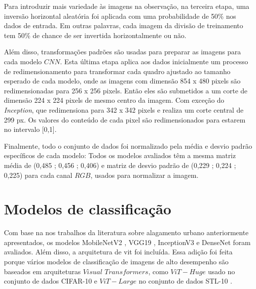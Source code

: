 
Para introduzir mais variedade às imagens na observação, na terceira etapa, uma inversão horizontal aleatória foi aplicada com uma probabilidade de 50\% nos dados de entrada.
Em outras palavras, cada imagem da divisão de treinamento tem 50\% de chance de ser invertida horizontalmente ou não.

Além disso, transformações padrões são usadas para preparar as imagens para cada modelo $CNN$. 
Esta última etapa aplica aos dados inicialmente um processo de redimensionamento para transformar cada quadro ajustado ao tamanho esperado de cada modelo,
onde as imagens com dimensão 854 x 480 pixels são redimensionadas para 256 x 256 pixels. 
Então eles são submetidos a um corte de dimensão 224 x 224 pixels de mesmo centro da imagem.
Com exceção do \textit{Inception}, que redimensiona para 342 x 342 pixels e realiza um corte central de 299 px.
Os valores do conteúdo de cada pixel são redimensionados para estarem no intervalo [0,1]. 


Finalmente, todo o conjunto de dados foi normalizado pela média e desvio padrão específicos de cada modelo:
Todos os modelos avaliados têm a mesma matriz média de (0,485 ; 0,456 ; 0,406) e matriz de desvio padrão de (0,229 ; 0,224 ; 0,225) para cada canal $RGB$, usados para normalizar a imagem. 
\section{Modelos de classificação}\label{sec:methodology_models}

Com base na nos trabalhos da literatura sobre alagamento urbano anteriormente apresentados, os modelos MobileNetV2 \cite{mobilenetv2}, VGG19 \cite{vgg}, InceptionV3 \cite{inception} e DenseNet \cite{densenet} foram avaliados.
Além disso, a arquitetura de \acrfull{vit}\cite{vit} foi incluída. Essa adição foi feita porque vários modelos de classificação de imagens de alto desempenho são baseados em arquiteturas $Visual$ $Transformers$, como $ViT-Huge$ usado no conjunto de dados CIFAR-10 \cite{dosovitskiy2021image} e $ViT-Large$ no conjunto de dados STL-10 \cite{gesmundo2022continual, kabir2023reduction}.

